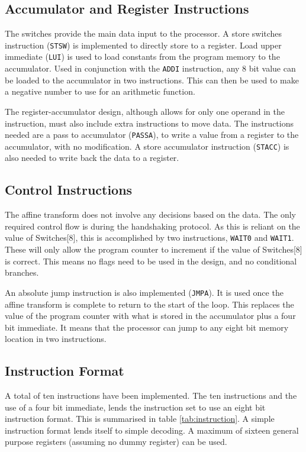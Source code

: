 \subsection{Accumulator and Register Instructions}

The switches provide the main data input to the processor. 
A store switches instruction (\texttt{STSW}) is implemented to directly store to a register. 
Load upper immediate (\texttt{LUI}) is used to load constants from the program memory to the accumulator. 
Used in conjunction with the \texttt{ADDI} instruction, any 8 bit value can be loaded to the accumulator in two instructions. 
This can then be used to make a negative number to use for an arithmetic function.

The register-accumulator design, although allows for only one operand in the instruction, must also include extra instructions to move data.
The instructions needed are a pass to accumulator (\texttt{PASSA}), to write a value from a register to the accumulator, with no modification. 
A store accumulator instruction (\texttt{STACC}) is also needed to write back the data to a register. 

\subsection{Control Instructions}

The affine transform does not involve any decisions based on the data. 
The only required control flow is during the handshaking protocol. 
As this is reliant on the value of Switches[8], this is accomplished by two instructions, \texttt{WAIT0} and \texttt{WAIT1}. 
These will only allow the program counter to increment if the value of Switches[8] is correct.
This means no flags need to be used in the design, and no conditional branches. 

An absolute jump instruction is also implemented (\texttt{JMPA}). 
It is used once the affine transform is complete to return to the start of the loop.
This replaces the value of the program counter with what is stored in the accumulator plus a four bit immediate. 
It means that the processor can jump to any eight bit memory location in two instructions.


\subsection{Instruction Format}

A total of ten instructions have been implemented. 
The ten instructions and the use of a four bit immediate, lends the instruction set to use an eight bit instruction format.
This is summarised in table \ref{tab:instruction}.
A simple instruction format lends itself to simple decoding. 
A maximum of sixteen general purpose registers (assuming no dummy register) can be used.

